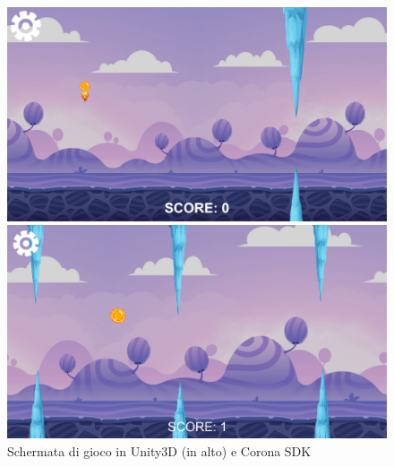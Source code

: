 	\newpage
	\begin{figure} [h!]
		\centering
		\includegraphics[width=\textwidth]{img/unityGame}
		
		\vspace{2cm}
		
		\includegraphics[width=\textwidth]{img/coronaGame}
		\caption{Schermata di gioco in Unity3D (in alto) e Corona SDK}
		\label{fig:game}
	\end{figure}
	
	\newpage
	
	
